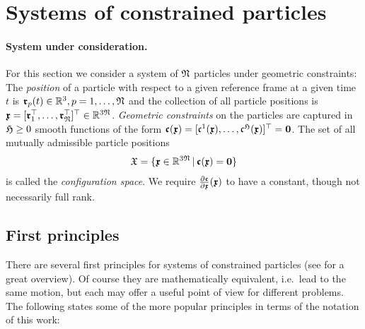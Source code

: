 \section{Systems of constrained particles}\label{sec:MechConstrainedParticles}

\paragraph{System under consideration.} For this section we consider a system of $\numParticles$ particles under geometric constraints:
The \textit{position} of a particle with respect to a given reference frame at a given time $t$ is $\particlePos{\PidxI}(t) \in \RealNum^3, \PidxI = 1,\ldots,\numParticles$ and the collection of all particle positions is $\particleCoord = [\particlePos{1}^\top,\ldots,\particlePos{\numParticles}^\top]^\top \in \RealNum^{3\numParticles}$.
\textit{Geometric constraints} on the particles are captured in $\numParticleConstraints \geq 0$ smooth functions of the form $\particleGeoConstraint(\particleCoord) = [\particleGeoConstraintCoeff{1}(\particleCoord), \ldots, \particleGeoConstraintCoeff{\numParticleConstraints}(\particleCoord)]^\top = \tuple{0}$.
The set of all mutually admissible particle positions 
\begin{align}
\particleConfigSpace = \{ \particleCoord \in \RealNum^{3\numParticles} \, | \, \particleGeoConstraint(\particleCoord) = \tuple{0} \} 
\end{align}
is called the \textit{configuration space}.
We require $\pdiff[\particleGeoConstraint]{\particleCoord}(\particleCoord)$ to have a constant, though not necessarily full rank.

\subsection{First principles}
There are several first principles for systems of constrained particles (see \cite{Lanczos:Variational} for a great overview).
Of course they are mathematically equivalent, i.e.\ lead to the same motion, but each may offer a useful point of view for different problems.
The following states some of the more popular principles in terms of the notation of this work:

